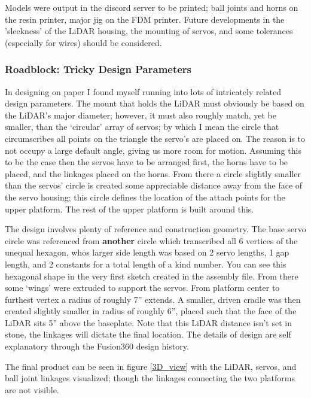 \documentclass[a4paper, 10pt]{article}
\begin{document}
		Models were output in the discord server to be printed; ball joints and horns on the resin printer, major jig on the FDM printer. Future developments in the 'sleekness' of the LiDAR housing, the mounting of servos, and some tolerances (especially for wires) should be considered.
		
		\subsubsection{Roadblock: Tricky Design Parameters}
		In designing on paper I found myself running into lots of intricately related design parameters. The mount that holds the LiDAR must obviously be based on the LiDAR's major diameter; however, it must also roughly match, yet be smaller, than the `circular' array of servos; by which I mean the circle that circumscribes all points on the triangle the servo's are placed on. The reason is to not occupy a large default angle, giving us more room for motion. Assuming this to be the case then the servos have to be arranged first, the horns have to be placed, and the linkages placed on the horns. From there a circle slightly smaller than the servos' circle is created some appreciable distance away from the face of the servo housing; this circle defines the location of the attach points for the upper platform. The rest of the upper platform is built around this.
		
		The design involves plenty of reference and construction geometry. The base servo circle was referenced from \textbf{another} circle which transcribed all 6 vertices of the unequal hexagon, whos larger side length was based on 2 servo lengths, 1 gap length, and 2 constants for a total length of a kind number. You can see this hexagonal shape in the very first sketch created in the assembly file. From there some `wings' were extruded to support the servos. From platform center to furthest vertex a radius of roughly 7'' extends. A smaller, driven cradle was then created slightly smaller in radius of roughly 6'', placed such that the face of the LiDAR sits 5'' above the baseplate. Note that this LiDAR distance isn't set in stone, the linkages will dictate the final location. The details of design are self explanatory through the Fusion360 design history.

\clearpage

		The final product can be seen in figure \ref{3D_view} with the LiDAR, servos, and ball joint linkages visualized; though the linkages connecting the two platforms are not visible.
		
\end{document}
